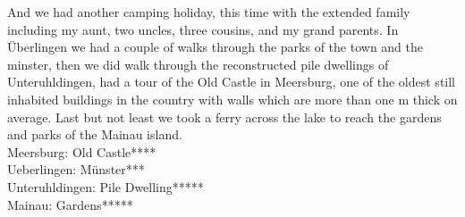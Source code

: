 And we had another camping holiday, this time with the extended family including my aunt, two uncles, three cousins, and my grand parents. In \"Uberlingen we had a couple of walks through the parks of the town and the minster, then we did walk through the reconstructed pile dwellings of Unteruhldingen, had a tour of the Old Castle in Meersburg, one of the oldest still inhabited buildings in the country with walls which are more than one m thick on average. Last but not least we took a ferry across the lake to reach the gardens and parks of the Mainau island.\\

Meersburg: Old Castle****\\
Ueberlingen: M\"unster***\\
Unteruhldingen: Pile Dwelling*****\\
 Mainau: Gardens*****